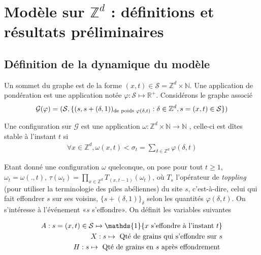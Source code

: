 \documentclass{article}
\theoremstyle{definition}
\begin{document}
\section{Modèle sur $\mathbb{Z}^d$ : définitions et résultats préliminaires}
\subsection{Définition de la dynamique du modèle}
Un sommet du graphe est de la forme $(x,t)\in \mathcal{S} = \mathbb{Z}^d\times \mathbb{N}$. Une application de pondération est une application notée $\varphi : \mathcal{S}\mapsto \mathbb{R}^+$. Considérons le graphe associé 
\begin{align*}
	\mathcal{G}(\varphi) = (\mathcal{S}, \{(s,s+(\delta,1))_{\textup{de poids } \varphi(\delta,t)} : \delta\in \mathbb{Z}^d, s=(x,t)\in \mathcal{S}\})
\end{align*}

Une configuration sur $\mathcal{G}$ est une application $\omega : \mathbb{Z}^d\times\mathbb{N}\to \mathbb{N}$ , celle-ci est dîtes stable à l'instant $t$ si
\begin{align*}
	\forall x\in\mathbb{Z}^d, \omega(x,t)<\sigma_t = \sum_{\delta\in \mathbb{Z}^d}\varphi(\delta,t)
\end{align*}

Etant donné une configuration $\omega$ quelconque, on pose pour tout $t\geq 1$, $\omega_t = \omega(.,t)$, $\tau(\omega_t) = \prod_{x\in \mathbb{Z}^d} T_{(x,t-1)} (\omega_t)$, où $T_s$ l'opérateur de \textit{toppling} (pour utiliser la terminologie des piles abéliennes) du site $s$, c'est-à-dire, celui qui fait effondrer $s$ sur ses voisins, $\{s+(\delta, 1)\}_{\delta}$ selon les quantités $\varphi(\delta,t)$. On s'intéresse à l'événement «$s$ s'effondre». On définit les variables suivantes

\begin{align*}
	A : s = (x,t)\in\mathcal{S} \mapsto \mathds{1}\{x\textup{ s'effondre à l'instant } t\}\\
	X : s \mapsto \textup{ Qté de grains qui s'effondre sur } s\\
	H : s \mapsto \textup{ Qté de grains en } s \textup{ après effondrement }
\end{align*}
\end{document}
